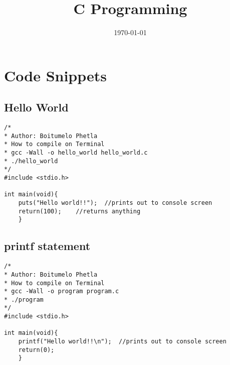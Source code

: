 \documentclass[10pt, a4paper, twocolumn]{article} %
\title{C Programming} %
\author{
	\authorstyle{Boitumelo Phetla} %
}
\date{\today} %
\begin{document}
\maketitle %

\thispagestyle{firstpage} %




\section{Code Snippets}

\subsection{Hello World}

\begin{lstlisting}
/*
* Author: Boitumelo Phetla
* How to compile on Terminal	
* gcc -Wall -o hello_world hello_world.c
* ./hello_world
*/
#include <stdio.h>

int main(void){
	puts("Hello world!!");	//prints out to console screen
	return(100);	//returns anything
	}

\end{lstlisting}

\subsection{printf statement}

\begin{lstlisting}
/*
* Author: Boitumelo Phetla
* How to compile on Terminal	
* gcc -Wall -o program program.c
* ./program
*/ 
#include <stdio.h>

int main(void){
	printf("Hello world!!\n");	//prints out to console screen
	return(0);	
	}

\end{lstlisting}



\printbibliography[title={Bibliography}] %

\end{document}
